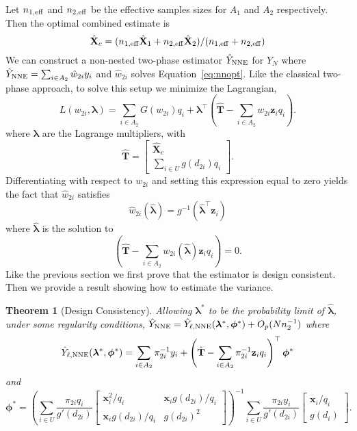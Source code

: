 \documentclass[12pt]{article}
\newtheorem{theorem}{Theorem}
\renewcommand{\bf}[1]{\mathbf{#1}}
\begin{document}
Let $n_{1, \rm{eff}}$ and $n_{2, \rm{eff}}$ be the effective samples sizes for
$A_1$ and $A_2$ respectively. Then the optimal combined estimate is 
$$
\hat{\bf X}_c = (n_{1, \rm{eff}} \hat{\bf X}_1 + n_{2, \rm{eff}}\hat{\bf X}_2) / 
(n_{1, \rm{eff}} + n_{2, \rm{eff}})
$$
We can construct a non-nested two-phase estimator $\hat Y_{\rm NNE}$ for $Y_N$ where
$\hat Y_{\rm NNE} = \sum_{i \in A_2} \hat w_{2i} y_i$ and $\hat w_{2i}$ solves
Equation~\ref{eq:nnopt}. Like the classical two-phase approach, to solve this
setup we minimize the Lagrangian,
\begin{equation}\label{eq:legragedc2}
  L(w_{2i}, \bm \lambda) = \sum_{i \in A_2} G(w_{2i}) q_i + 
  \bm \lambda^\top \left( \hat{\bf T} - \sum_{i \in A_2} w_{2i} \bf z_i q_i\right).
\end{equation}
where $\bm \lambda$ are the Lagrange multipliers, with 
$$\hat{\bf T} = 
\begin{bmatrix}
\hat{\bf X}_c \\ \sum_{i \in U} g(d_{2i}) q_i
\end{bmatrix}.
$$
Differentiating with respect to $w_{2i}$ and setting this expression equal to
zero yields the fact that $\hat w_{2i}$ satisfies 
$$ \hat w_{2i}(\hat{\bm \lambda}) = g^{-1}(\hat{\bm \lambda}^\top \bf z_i) $$
where $\hat{\bm \lambda}$ is the solution to
\begin{equation}\label{eq:lamdc2}
  \left( \hat{\bf T} - \sum_{i \in A_2} w_{2i}(\hat{\bm \lambda}) \bf z_i
  q_i\right) = 0.
\end{equation}
Like the previous section we first prove that the estimator is design consistent.
Then we provide a result showing how to estimate the variance.

\begin{theorem}[Design Consistency]\label{thm:dc2}
  Allowing $\bm \lambda^*$ to be the probability limit of $\hat{\bm \lambda}$,
  under some regularity conditions, 
  $\hat Y_{\rm NNE} = \hat Y_{\ell, \rm NNE}(\bm \lambda^*,
  \bm \phi^*) + O_p(Nn_2^{-1})$ where
  $$
  \hat Y_{\ell, \rm NNE}(\bm \lambda^*, \bm \phi^*) = 
  \sum_{i \in A_2} \pi_{2i}^{-1} y_i + 
  \left(\hat{\bf T} - \sum_{i \in A_2} \pi_{2i}^{-1} \bf z_i q_i\right)^\top \bm \phi^*
  $$
  and 
  $$
  \bm \phi^* =
  \left(\sum_{i \in U} \frac{\pi_{2i} q_i}{g'(d_{2i})} 
  \begin{bmatrix}
    \bf x_i^2 / q_i & \bf x_i g(d_{2i}) / q_i \\
    \bf x_i g(d_{2i}) / q_i & g(d_{2i})^2
  \end{bmatrix}
  \right)^{-1}
  \sum_{i \in U} \frac{\pi_{2i} y_i}{g'(d_{2i})} 
  \begin{bmatrix} \bf x_i / q_i \\ g(d_i) \end{bmatrix}.
  $$
\end{theorem}
\end{document}
